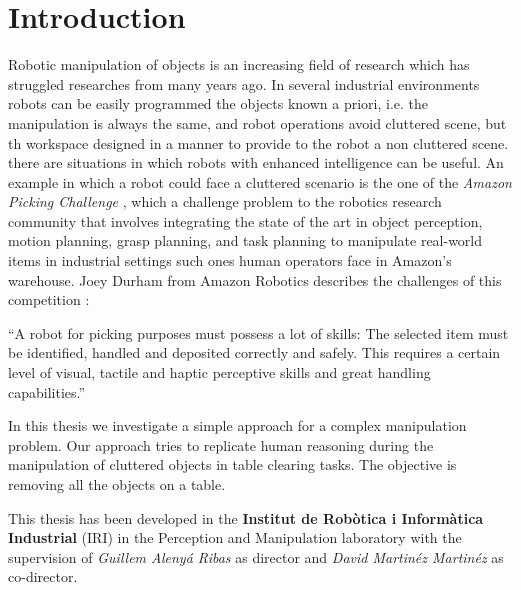 
\chapter{Introduction}
\label{ch:introduction}

Robotic manipulation of objects is an increasing field of research which has struggled  researches from many years ago. In several industrial environments robots can be easily programmed  the objects  known a priori, i.e. the manipulation is always the same, and  robot operations avoid  cluttered scene, but th workspace  designed in a manner to provide to the robot a non cluttered scene.  there are situations in which robots with enhanced intelligence can be useful.
 An example in which a robot could face a cluttered scenario is the one of the \textit{Amazon Picking Challenge} \citep{APC}, which  a challenge problem to the robotics research community that involves integrating the state of the art in object perception, motion planning, grasp planning, and task planning to manipulate real-world items in industrial settings such  ones human operators face in Amazon's warehouse. Joey Durham from Amazon Robotics describes the challenges of this competition :
\begin{displayquote}
 “A robot for picking purposes must possess a lot of skills: The selected item must be identified, handled and deposited correctly and safely. This requires a certain level of visual, tactile and haptic perceptive skills and great handling capabilities.”
\end{displayquote}

In this thesis we  investigate a simple approach for a complex manipulation problem. Our approach tries to replicate  human reasoning during the manipulation of cluttered objects in table clearing tasks. The objective is removing all the objects on a table. 

This thesis has been developed in the \textbf{Institut de Robòtica i Informàtica Industrial} (IRI) in the  Perception and Manipulation laboratory with the supervision of \textit{Guillem Alenyá Ribas} as director and \textit{David Martinéz Martinéz} as co-director. 

